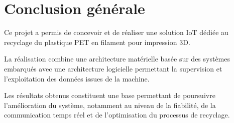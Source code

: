\documentclass[12pt,a4paper,french]{report}
\begin{document}




\chapter*{Conclusion générale}


Ce projet a permis de concevoir et de réaliser une solution IoT dédiée
au recyclage du plastique PET en filament pour impression 3D.

La réalisation combine une architecture matérielle basée sur des
systèmes embarqués avec une architecture logicielle permettant la
supervision et l'exploitation des données issues de la machine.

Les résultats obtenus constituent une base permettant de poursuivre
l'amélioration du système, notamment au niveau de la fiabilité, de la
communication temps réel et de l'optimisation du processus de recyclage.



\newpage






\end{document}
